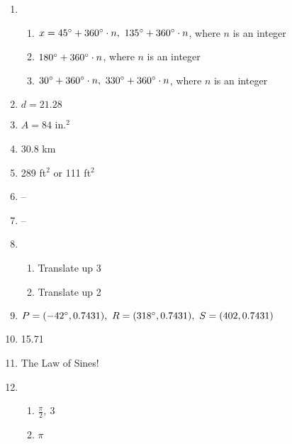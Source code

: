 \documentclass{article}
\begin{document}
\begin{enumerate}
\item

	\begin{enumerate}
	
	\item $x = 45\degree + 360\degree \cdot n, \ 135\degree + 360\degree \cdot n$, where $n$ is an integer
	
	\item $180\degree + 360\degree \cdot n$, where $n$ is an integer
	
	\item $30\degree + 360\degree \cdot n, \ 330\degree + 360\degree \cdot n$, where $n$ is an integer
	
	\end{enumerate}
	
\item $d = 21.28$

\item $A = 84$ in.$^2$

\item 30.8 km

\item 289 ft$^2$ or 111 ft$^2$

\item --

\item --

\item

	\begin{enumerate}
	
	\item Translate up 3
	
	\item Translate up 2
	
	\end{enumerate}
	
\item $P = (-42\degree, 0.7431), \ R = (318\degree, 0.7431), \ S = (402, 0.7431)$

\item 15.71

\item The Law of Sines!

\item

	\begin{enumerate}
	
	\item $\frac{\pi}{2}, \ 3$
	
	\item $\pi$
	

\end{enumerate}
\end{enumerate}
\end{document}
